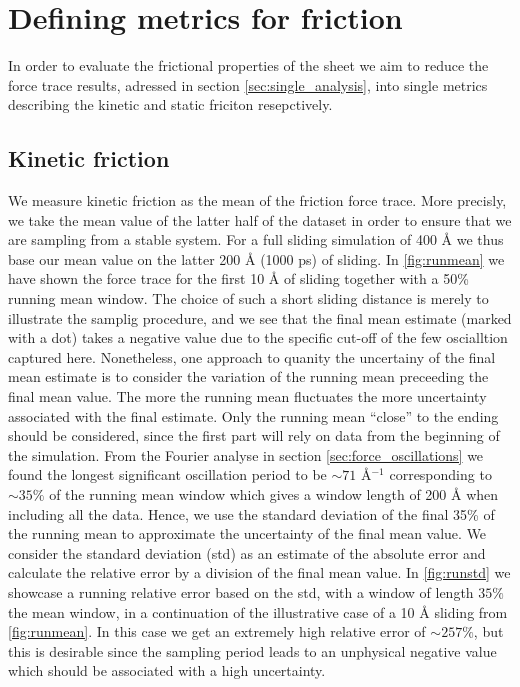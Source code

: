 \section{Defining metrics for friction}\label{sec:def_dyn_and_stat}

In order to evaluate the frictional properties of the sheet we aim to reduce the force trace results, adressed in section \cref{sec:single_analysis}, into single metrics describing the kinetic and static friciton resepctively. 

\subsection{Kinetic friction} 
We measure kinetic friction as the mean of the friction force trace. More
precisly, we take the mean value of the latter half of the dataset in order to
ensure that we are sampling from a stable system. For a full sliding simulation
of 400 Å we thus base our mean value on the latter 200 Å (1000 ps) of sliding.
In \cref{fig:runmean} we have shown the force trace for the first 10 Å of
sliding together with a 50\% running mean window. The choice of such a short sliding distance is merely to illustrate the samplig procedure,
and we see that the final mean estimate (marked
with a dot) takes a negative value due to the specific cut-off of the few
oscialltion captured here. Nonetheless, one approach to quanity the uncertainy
of the final mean estimate is to consider the variation of the running mean
preceeding the final mean value. The more the running mean fluctuates the more
uncertainty associated with the final estimate. Only the running mean
``close'' to the ending should be considered, since the first part will rely on
data from the beginning of the simulation. From the Fourier analyse in section
\cref{sec:force_oscillations} we found the longest significant oscillation
period to be $\sim 71$ Å$^{-1}$ corresponding to $\sim 35 \%$ of the running
mean window which gives a window length of 200 Å when including all the data.
Hence, we use the standard deviation of the final 35\% of the running mean to
approximate the uncertainty of the final mean value. We consider the standard
deviation (\acrshort{std}) as an estimate of the absolute error and calculate the relative error
by a division of the final mean value. In \cref{fig:runstd} we showcase a
running relative error based on the \acrshort{std}, with a window of length
$35 \%$ the mean window, in a continuation of the illustrative case of a 10 Å
sliding from \cref{fig:runmean}. In this case we get an extremely high relative error of $\sim 257\%$, but this is desirable since the sampling period leads to an unphysical negative value which should be associated with a high uncertainty. 

